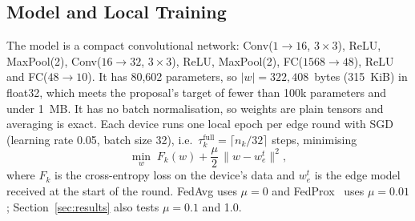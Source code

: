 \documentclass[conference]{IEEEtran}
\newcommand{\wsize}{|w|}
\begin{document}
\subsection{Model and Local Training}
The model is a compact convolutional network: Conv($1\!\rightarrow\!16$, $3\times3$), ReLU, MaxPool(2), Conv($16\!\rightarrow\!32$, $3\times3$), ReLU, MaxPool(2), FC($1568\!\rightarrow\!48$), ReLU and FC($48\!\rightarrow\!10$). It has 80{,}602 parameters, so $\wsize = 322{,}408$~bytes (315~KiB) in float32, which meets the proposal's target of fewer than 100k parameters and under 1~MB. It has no batch normalisation, so weights are plain tensors and averaging is exact. Each device runs one local epoch per edge round with SGD (learning rate 0.05, batch size 32), i.e.\ $\tau_k^{\mathrm{full}} = \lceil n_k/32 \rceil$ steps, minimising
\begin{equation}
\min_{w}\; F_k(w) + \frac{\mu}{2}\,\| w - w_e^{t} \|^2 ,
\label{eq:prox}
\end{equation}
where $F_k$ is the cross-entropy loss on the device's data and $w_e^{t}$ is the edge model received at the start of the round. FedAvg uses $\mu = 0$ and FedProx~\cite{li2020fedprox} uses $\mu = 0.01$; Section~\ref{sec:results} also tests $\mu = 0.1$ and 1.0.
\end{document}
